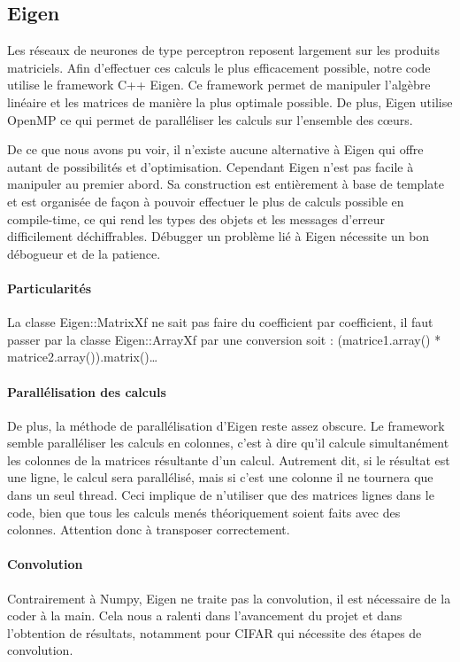 \subsection{Eigen}
Les réseaux de neurones de type perceptron reposent largement sur les produits matriciels. Afin d'effectuer ces calculs le plus efficacement possible, notre code utilise le framework C++ Eigen. Ce framework permet de manipuler l'algèbre linéaire et les matrices de manière la plus optimale possible. De plus, Eigen utilise OpenMP ce qui permet de paralléliser les calculs sur l'ensemble des cœurs. 

De ce que nous avons pu voir, il n'existe aucune alternative à Eigen qui offre autant de possibilités et d'optimisation. Cependant Eigen n'est pas facile à manipuler au premier abord. Sa construction est entièrement à base de template et est organisée de façon à pouvoir effectuer le plus de calculs possible en compile-time, ce qui rend les types des objets et les messages d'erreur difficilement déchiffrables. Débugger un problème lié à Eigen nécessite un bon débogueur et de la patience. 

\paragraph{Particularités}
La classe Eigen::MatrixXf ne sait pas faire du coefficient par coefficient, il faut passer par la classe Eigen::ArrayXf par une conversion
soit : (matrice1.array() * matrice2.array()).matrix()…
\paragraph{Parallélisation des calculs}
De plus, la méthode de parallélisation d'Eigen reste assez obscure. Le framework semble paralléliser les calculs en colonnes, c'est à dire qu'il calcule simultanément les colonnes de la matrices résultante d'un calcul. Autrement dit, si le résultat est une ligne, le calcul sera parallélisé, mais si c'est une colonne il ne tournera que dans un seul thread. Ceci implique de n'utiliser que des matrices lignes dans le code, bien que tous les calculs menés théoriquement soient faits avec des colonnes. Attention donc à transposer correctement.
\paragraph{Convolution}\label{implementation-C++-convolution}
Contrairement à Numpy, Eigen ne traite pas la convolution, il est nécessaire de la coder à la main. Cela nous a ralenti dans l'avancement du projet et dans l'obtention de résultats, notamment pour CIFAR qui nécessite des étapes de convolution.